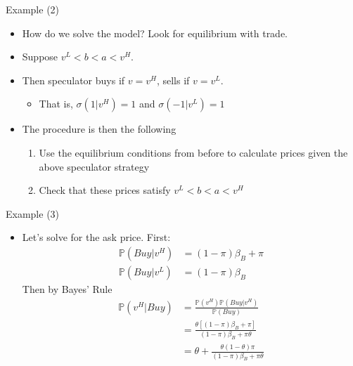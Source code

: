 \documentclass[english,10pt
,aspectratio=169
]{beamer}
\begin{document}
\begin{frame}{Example (2)}
	\begin{itemize}
		\item How do we solve the model? Look for equilibrium with trade. 
		\item Suppose $v^L < b < a < v^H$.
		\item Then speculator buys if $v=v^H$, sells if $v=v^L$. 
		\begin{itemize}
			\item That is, $\sigma(1|v^H)=1$ and $\sigma(-1|v^L)=1$
		\end{itemize}
		\item The procedure is then the following
		\begin{enumerate}
			\item Use the equilibrium conditions from before to calculate prices given the above speculator strategy
			\item Check that these prices satisfy $v^L < b < a < v^H$
		\end{enumerate}
	\end{itemize}
\end{frame}


\begin{frame}{Example (3)}
\begin{itemize}
	\item Let's solve for the ask price. First:
	\begin{align*}
		\mathbb{P}(Buy| v^H) & = (1-\pi) \beta_B + \pi \\
		\mathbb{P}(Buy| v^L) & = (1-\pi) \beta_B
	\end{align*}
	Then by Bayes' Rule
	\begin{align*}
		\mathbb{P}(v^H|Buy) & = \frac{\mathbb{P}(v^H) \mathbb{P}(Buy| v^H)}{\mathbb{P}(Buy)}  \\
		& = \frac{\theta [(1-\pi)\beta_B+\pi]}{(1-\pi)\beta_B+ \pi\theta}  \\
		& =  \theta + \frac{\theta(1-\theta) \pi}{(1-\pi)\beta_B+\pi\theta}
	\end{align*}
\end{itemize}
\end{frame}
\end{document}
